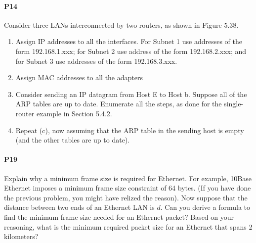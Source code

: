 \documentclass[12pt,letterpaper]{article}
\begin{document}
\paragraph{P14}
Consider three LANs interconnected by two routers, as shown in Figure 5.38.
\begin{enumerate}
\item Assign IP addresses to all the interfaces. For Subnet 1 use addresses
    of the form 192.168.1.xxx; for Subnet 2 use address of the form 
    192.168.2.xxx; and for Subnet 3 use addresses of the form 192.168.3.xxx.
\item Assign MAC addresses to all the adapters
\item Consider sending an IP datagram from Host E to Host b. Suppose all of
    the ARP tables are up to date. Enumerate all the steps, as done for the
    single-router example in Section 5.4.2.
\item Repeat (c), now assuming that the ARP table in the sending host is empty
    (and the other tables are up to date).
\end{enumerate}
\paragraph{P19}
Explain why a minimum frame size is required for Ethernet. For example, 10Base
Ethernet imposes a minimum frame size constraint of 64 bytes. (If you have done
the previous problem, you might have relized the reason). Now suppose that the
distance between two ends of an Ethernet LAN is $d$. Can you derive a formula
to find the minimum frame size needed for an Ethernet packet? Based on your
reasoning, what is the minimum required packet size for an Ethernet that spans
2 kilometers?
\end{document}

